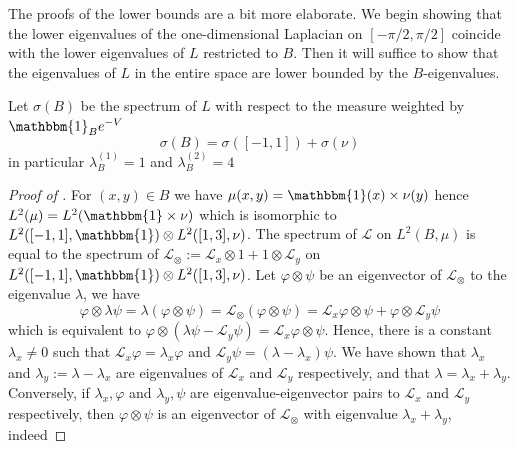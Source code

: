 The proofs of the lower bounds are a bit more elaborate. We begin showing that the lower eigenvalues of the one-dimensional Laplacian on $[-\pi/2, \pi/2]$ coincide with the lower eigenvalues of $L$ restricted to $B$. Then it will suffice to show that the eigenvalues of $L$ in the entire space are lower bounded by the $B$-eigenvalues. 

\begin{lemma}\label{lem:spectrum_decomposition}
Let $\sigma(B)$ be the spectrum of $L$ with respect to the measure weighted by $\mathbbm{1}_B e^{-V}$
\begin{equation*}
    \sigma(B) = \sigma([-1,1]) + \sigma(\nu)
\end{equation*}
    in particular \( \lambda_B^{(1)} = 1 \) and \( \lambda_B^{(2)} = 4 \)
\end{lemma}
\begin{proof}[Proof of ]
    For \( (x,y) \in  B \) we have \( \mu(x,y) = \mathbbm{1}(x) \times \nu(y) \) hence \( L^2(\mu) = L^2(\mathbbm{1} \times \nu) \) which is isomorphic to \( L^2([-1,1], \mathbbm{1}) \otimes L^2([1,3], \nu) \). The spectrum of \( \mathcal L \) on \( L^2(B, \mu) \) is equal to the spectrum of \( \mathcal L_{\otimes} := \mathcal L_x \otimes 1 + 1 \otimes \mathcal L_y \) on \( L^2([-1,1], \mathbbm{1}) \otimes L^2([1,3], \nu) \). Let \( \varphi \otimes \psi \) be an eigenvector of \( \mathcal L_\otimes \) to the eigenvalue \( \lambda \), we have
    \begin{equation*}
        \varphi \otimes \lambda \psi = \lambda(\varphi \otimes \psi) = \mathcal L_\otimes (\varphi \otimes \psi) = \mathcal{L}_x \varphi \otimes \psi + \varphi \otimes \mathcal L_y \psi
    \end{equation*}
    which is equivalent to \( \varphi \otimes (\lambda \psi - \mathcal L_y \psi) = \mathcal L_x\varphi \otimes \psi \). Hence, there is a constant \( \lambda_x \ne 0 \) such that \( \mathcal L_x \varphi = \lambda_x \varphi \) and \( \mathcal L_y \psi = (\lambda - \lambda_x)\psi \). We have shown that \( \lambda_x \) and \( \lambda_y := \lambda - \lambda_x \) are eigenvalues of \( \mathcal L_x \) and \( \mathcal L_y \) respectively, and that \( \lambda = \lambda_x + \lambda_y \). \\
    Conversely, if \( \lambda_x, \varphi \) and \( \lambda_y, \psi \) are eigenvalue-eigenvector pairs to \( \mathcal L_x \) and \( \mathcal L_y \) respectively, then \( \varphi \otimes \psi \) is an eigenvector of \( \mathcal L_{\otimes} \) with eigenvalue \( \lambda_x + \lambda_y \), indeed

\end{proof}
